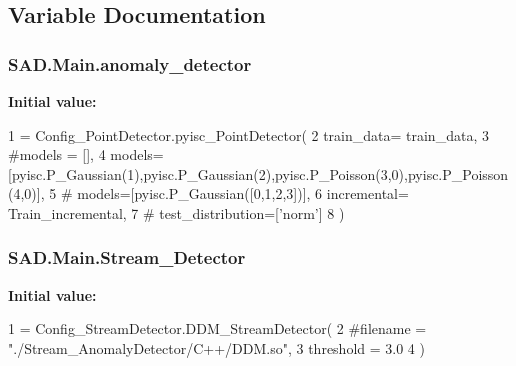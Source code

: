 \subsection{Variable Documentation}
\subsubsection[{\texorpdfstring{anomaly\+\_\+detector}{anomaly_detector}}]{\setlength{\rightskip}{0pt plus 5cm}S\+A\+D.\+Main.\+anomaly\+\_\+detector}\hypertarget{namespaceSAD_1_1Main_a6fae104012e304d1adde92108c00b261}{}\label{namespaceSAD_1_1Main_a6fae104012e304d1adde92108c00b261}
{\bfseries Initial value\+:}
\begin{DoxyCode}
1 = Config\_PointDetector.pyisc\_PointDetector(
2     train\_data= train\_data,
3     \textcolor{comment}{#models = [],}
4     models=[pyisc.P\_Gaussian(1),pyisc.P\_Gaussian(2),pyisc.P\_Poisson(3,0),pyisc.P\_Poisson(4,0)],
5     \textcolor{comment}{# models=[pyisc.P\_Gaussian([0,1,2,3])],}
6     incremental= Train\_incremental,
7     \textcolor{comment}{# test\_distribution=['norm']}
8 )
\end{DoxyCode}
\subsubsection[{\texorpdfstring{Stream\+\_\+\+Detector}{Stream_Detector}}]{\setlength{\rightskip}{0pt plus 5cm}S\+A\+D.\+Main.\+Stream\+\_\+\+Detector}\hypertarget{namespaceSAD_1_1Main_adedbb4deb28e6f7b98f42f21f1330352}{}\label{namespaceSAD_1_1Main_adedbb4deb28e6f7b98f42f21f1330352}
{\bfseries Initial value\+:}
\begin{DoxyCode}
1 = Config\_StreamDetector.DDM\_StreamDetector(
2     \textcolor{comment}{#filename = "./Stream\_AnomalyDetector/C++/DDM.so",}
3     threshold = 3.0
4 )
\end{DoxyCode}
